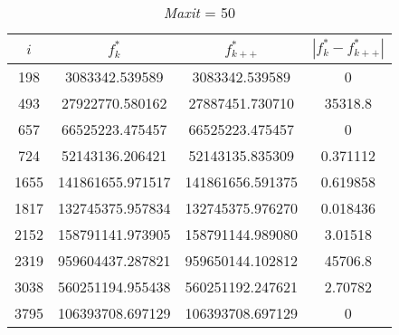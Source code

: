 \documentclass[12pt,a4paper,oneside,hidelinks]{report}
\begin{document}
\begin{table}[h]\ContinuedFloat %
	\centering
	\def\arraystretch{1.4}	
	
	\begin{subtable}{\textwidth}
		\centering
		\begin{tabular}{|S[table-parse-only = true]
						|S[table-format = 9.6, table-number-alignment = center]
						|S[table-format = 9.6, table-number-alignment = center]
						|S[table-parse-only = true]|}
			
			\hline			
			{$i$} & {$f_{k}^*$} & {$f_{k++}^*$} & {$|f_{k}^* - f_{k++}^*|$} \\	
			
			\hline		
			
			198  &  3083342.539589   & 3083342.539589   & 0  \\
			493  &  27922770.580162  & 27887451.730710  & 35318.8 \\
			657  &  66525223.475457  & 66525223.475457  & 0 \\
			724  &  52143136.206421  & 52143135.835309  & 0.371112\\
			1655 &  141861655.971517 & 141861656.591375 & 0.619858 \\
			1817 &  132745375.957834 & 132745375.976270 & 0.018436 \\
			2152 &	158791141.973905 & 158791144.989080 & 3.01518 \\
			2319 &  959604437.287821 & 959650144.102812 & 45706.8 \\
			3038 &  560251194.955438 & 560251192.247621 & 2.70782 \\
			3795 &  106393708.697129 & 106393708.697129 & 0 \\
			
			\hline
		\end{tabular}
		\vspace*{0.2 cm}
		\caption{\textit{Maxit} = 50}
	\end{subtable}%
\end{table}

\vspace*{1.9 cm}

\end{document}
